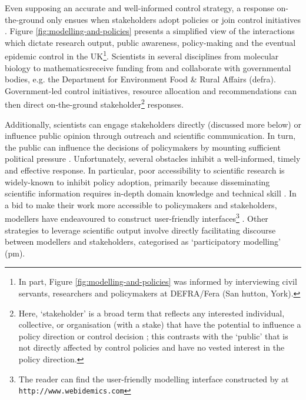 Even supposing an accurate and well-informed control strategy,
a response on-the-ground only ensues when stakeholders adopt policies or join control initiatives \cite{reed2018theory}.
Figure \ref{fig:modelling-and-policies} presents a simplified view of the interactions which dictate research output, public awareness, 
policy-making and the eventual epidemic control in the UK\footnote{
In part, Figure \ref{fig:modelling-and-policies} was informed by interviewing civil servants, researchers and policymakers at DEFRA/Fera (San hutton, York).}. Scientists in several disciplines\textemdash
from molecular biology to mathematics\textemdash receive funding from and collaborate with governmental
bodies, e.g. the Department for Environment Food \& Rural Affairs (\acrshort{defra}). Government-led control initiatives, resource
allocation and recommendations can then direct on-the-ground stakeholder\footnote{Here, `stakeholder' is a broad
term that reflects any interested individual, collective, or organisation 
(with a stake) that have the potential to influence a policy direction or control decision
\cite{brugha2000stakeholder}; this contrasts with the `public' that is not directly affected by control policies and have no vested interest in the policy direction.} 
responses. 

Additionally, scientists can engage stakeholders directly (discussed more below) or influence public opinion through outreach and
scientific communication. In turn, the public can influence the decisions of policymakers by
mounting sufficient political pressure \cite{fuller2016public}.
Unfortunately, several obstacles inhibit a well-informed, timely and effective response. 
In particular, poor accessibility to scientific research is widely-known to inhibit policy adoption, 
primarily because disseminating scientific information requires in-depth domain knowledge and technical skill \cite{jones2020modelling}.
In a bid to make their work more accessible to policymakers and stakeholders, modellers have endeavoured to construct user-friendly interfaces\footnote{
The reader can find the user-friendly modelling interface constructed by \cite{WEBIDEMICS} at \nolinkurl{http://www.webidemics.com}} \cite{WEBIDEMICS}.
Other strategies to leverage scientific output involve directly facilitating discourse between modellers and stakeholders, categorised as `participatory modelling' (\acrshort{pm}).

